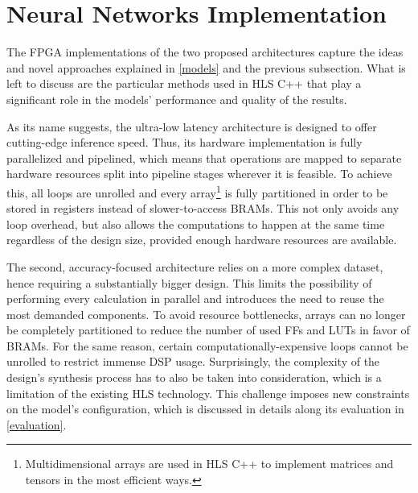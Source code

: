 \section{Neural Networks Implementation}
The FPGA implementations of the two proposed architectures capture the ideas and novel approaches explained in \cref{models} and the previous subsection. What is left to discuss are the particular methods used in HLS C++ that play a significant role in the models' performance and quality of the results.

As its name suggests, the ultra-low latency architecture is designed to offer cutting-edge inference speed. Thus, its hardware implementation is fully parallelized and pipelined, which means that operations are mapped to separate hardware resources split into pipeline stages wherever it is feasible. To achieve this, all loops are unrolled and every array\footnote{Multidimensional arrays are used in HLS C++ to implement matrices and tensors in the most efficient ways.} is fully partitioned in order to be stored in registers instead of slower-to-access BRAMs. This not only avoids any loop overhead, but also allows the computations to happen at the same time regardless of the design size, provided enough hardware resources are available.

The second, accuracy-focused architecture relies on a more complex dataset, hence requiring a substantially bigger design. This limits the possibility of performing every calculation in parallel and introduces the need to reuse the most demanded components. To avoid resource bottlenecks, arrays can no longer be completely partitioned to reduce the number of used FFs and LUTs in favor of BRAMs. For the same reason, certain computationally-expensive loops cannot be unrolled to restrict immense DSP usage. Surprisingly, the complexity of the design's synthesis process has to also be taken into consideration, which is a limitation of the existing HLS technology. This challenge imposes new constraints on the model's configuration, which is discussed in details along its evaluation in \cref{evaluation}.


